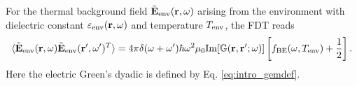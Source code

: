 For the thermal background field $\tilde{\mathbf{E}}_{\textrm{env}}(\mathbf{r},\omega)$ arising from the environment with dielectric constant $\varepsilon_{\textrm{env}}(\mathbf{r},\omega)$ and temperature $T_{\textrm{env}}$, the FDT reads \cite{novotny}
\begin{equation}
 \langle \tilde{\mathbf{E}}_{\textrm{env}}(\mathbf{r},\omega) \tilde{\mathbf{E}}_{\textrm{env}}(\mathbf{r}',\omega')^T \rangle = 4\pi \delta(\omega+\omega') \hbar \omega^2 \mu_0 \textrm{Im}[\mathbb{G}(\mathbf{r},\mathbf{r}';\omega)] \left[f_{\textrm{BE}}(\omega,T_{\textrm{env}})+ \frac{1}{2} \right]. \label{eq:th_e0e0om}
\end{equation}
Here the electric Green's dyadic is defined by Eq. \eqref{eq:intro_gemdef}. %



